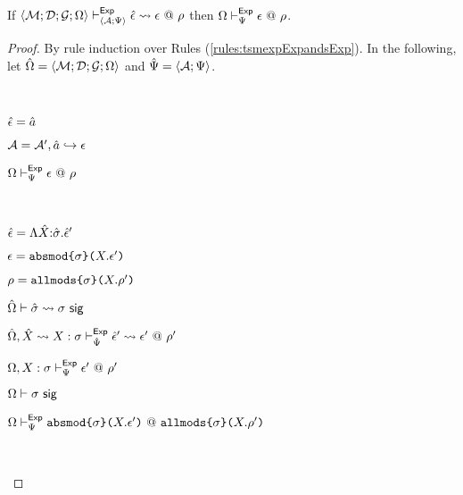 \begin{theorem}
\label{thm:peTSM-expression-expansion}
If $\langle \mathcal{M}; \mathcal{D}; \mathcal{G}; \Omega \rangle \vdash_{\langle \mathcal{A}; \Psi \rangle}^{\mathsf{Exp}} {\hat\epsilon} \leadsto \epsilon~@~\rho$ then $\Omega \vdash_{\Psi}^{\mathsf{Exp}} \epsilon ~@~ \rho$.
\end{theorem}
\begin{proof}
By rule induction over Rules (\ref{rules:tsmexpExpandsExp}). In the following, let ${\hat\Omega}=\langle \mathcal{M}; \mathcal{D}; \mathcal{G}; \Omega \rangle$ and $\hat{\Psi}=\langle \mathcal{A}; \Psi \rangle$.
\begin{byCases}
  \item[\text{(\ref{rule:tsmexpExpandsExp-bindref})}] ~
    \begin{pfsteps*}
      \item ${\hat\epsilon} = \hat{a}$ 
      \item $\mathcal{A} = \mathcal{A}', \hat{a} \hookrightarrow \epsilon$ 
      \item $\Omega \vdash_{\Psi}^{\mathsf{Exp}} \epsilon ~@~ \rho$  
    \end{pfsteps*}
    \resetpfcounter
  \item[\text{(\ref{rule:tsmexpExpandsExp-absmod})}] ~
    \begin{pfsteps*}
      \item ${\hat\epsilon}=\Lambda {\hat X}{:}{\hat\sigma}.{\hat\epsilon}'$ 
      \item $\epsilon=\texttt{absmod}\texttt{\{}\sigma\texttt{\}(}X.\epsilon'\texttt{)}$ 
      \item $\rho=\texttt{allmods}\texttt{\{}\sigma\texttt{\}(}X.\rho'\texttt{)}$ 
      \item ${\hat\Omega} \vdash {\hat\sigma} \leadsto \sigma~\mathsf{sig}$  
      \item ${\hat\Omega}, {\hat X} \leadsto X : \sigma \vdash_{\hat{\Psi}}^{\mathsf{Exp}} {\hat\epsilon}' \leadsto \epsilon'~@~\rho'$  
      \item $\Omega, X : \sigma \vdash_{\Psi}^{\mathsf{Exp}} \epsilon' ~@~ \rho'$  
      \item $\Omega \vdash \sigma~\mathsf{sig}$  
      \item $\Omega \vdash_{\Psi}^{\mathsf{Exp}} \texttt{absmod}\texttt{\{}\sigma\texttt{\}(}X.\epsilon'\texttt{)} ~@~ \texttt{allmods}\texttt{\{}\sigma\texttt{\}(}X.\rho'\texttt{)}$ 
    \end{pfsteps*}
    \resetpfcounter
  \item[\text{(\ref{rule:tsmexpExpandsExp-apmod})}] ~

\end{byCases}
\end{proof}

